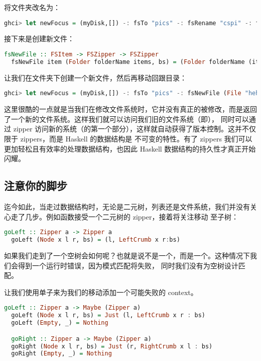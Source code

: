 \documentclass[./main.tex]{subfiles}
\begin{document}
将文件夹改名为：

\begin{lstlisting}[language=Haskell]
  ghci> let newFocus = (myDisk,[]) -: fsTo "pics" -: fsRename "cspi" -: fsUp
\end{lstlisting}

接下来是创建新文件：

\begin{lstlisting}[language=Haskell]
  fsNewFile :: FSItem -> FSZipper -> FSZipper
  fsNewFile item (Folder folderName items, bs) = (Folder folderName (item : items), bs)
\end{lstlisting}

让我们在文件夹下创建一个新文件，然后再移动回跟目录：

\begin{lstlisting}[language=Haskell]
  ghci> let newFocus = (myDisk,[]) -: fsTo "pics" -: fsNewFile (File "heh.jpg" "lol") -: fsUp
\end{lstlisting}

这里很酷的一点就是当我们在修改文件系统时，它并没有真正的被修改，而是返回了一个新的文件系统。这样我们就可以访问我们旧的文件系统（即），
同时可以通过 zipper 访问新的系统（的第一个部分），这样就自动获得了版本控制。这并不仅限于 zippers，而是 Haskell 的数据结构是
不可变的特性。有了 zippers 我们可以更加轻松且有效率的处理数据结构，也因此 Haskell 数据结构的持久性才真正开始闪耀。

\subsection*{注意你的脚步}

迄今如此，当走过数据结构时，无论是二元树，列表还是文件系统，我们并没有关心走了几步。例如函数接受一个二元树的 zipper，接着将关注移动
至子树：

\begin{lstlisting}[language=Haskell]
  goLeft :: Zipper a -> Zipper a
  goLeft (Node x l r, bs) = (l, LeftCrumb x r:bs)
\end{lstlisting}

如果我们走到了一个空树会如何呢？也就是说不是一个，而是一个。这种情况下我们会得到一个运行时错误，因为模式匹配将失败，
同时我们没有为空树设计匹配。

让我们使用单子来为我们的移动添加一个可能失败的 context。

\begin{lstlisting}[language=Haskell]
  goLeft :: Zipper a -> Maybe (Zipper a)
  goLeft (Node x l r, bs) = Just (l, LeftCrumb x r : bs)
  goLeft (Empty, _) = Nothing

  goRight :: Zipper a -> Maybe (Zipper a)
  goRight (Node x l r, bs) = Just (r, RightCrumb x l : bs)
  goRight (Empty, _) = Nothing
\end{lstlisting}
\end{document}
